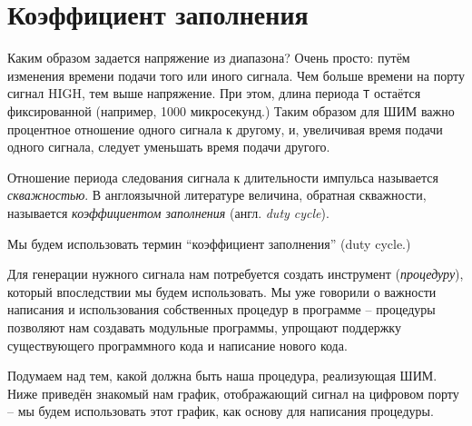 \documentclass[../sparc.tex]{subfiles}
\begin{document}
\section{Коэффициент заполнения}

Каким образом задается напряжение из диапазона? Очень просто: путём изменения
времени подачи того или иного сигнала. Чем больше времени на порту сигнал HIGH,
тем выше напряжение. При этом, длина периода \texttt{T} остаётся фиксированной
(например, 1000 микросекунд.)  Таким образом для \gls{ШИМ} важно процентное
отношение одного сигнала к другому, и, увеличивая время подачи одного сигнала,
следует уменьшать время подачи другого.


Отношение периода следования сигнала к длительности импульса называется
\emph{скважностью}.  В англоязычной литературе величина, обратная скважности,
называется \emph{коэффициентом заполнения} (англ. \emph{duty cycle}).

Мы будем использовать термин ``коэффициент заполнения'' (duty cycle.)


Для генерации нужного сигнала нам потребуется создать инструмент
(\emph{процедуру}), который впоследствии мы будем использовать.  Мы уже говорили
о важности написания и использования собственных процедур в программе --
процедуры позволяют нам создавать модульные программы, упрощают поддержку
существующего программного кода и написание нового кода.

Подумаем над тем, какой должна быть наша процедура, реализующая ШИМ.  Ниже
приведён знакомый нам график, отображающий сигнал на цифровом порту -- мы будем
использовать этот график, как основу для написания процедуры.
\end{document}
